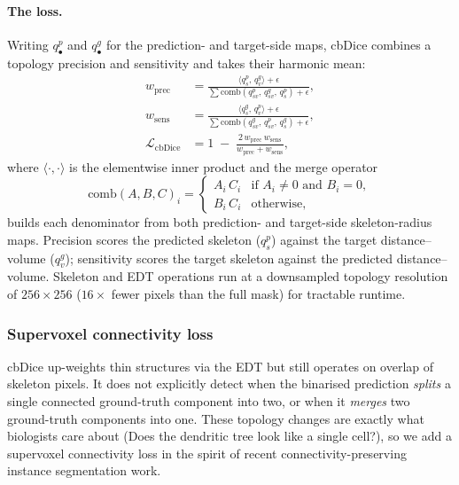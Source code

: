 \documentclass[11pt,a4paper]{article}
\begin{document}
\paragraph{The loss.} Writing $q^{p}_\bullet$ and $q^{g}_\bullet$ for the
prediction- and target-side maps, cbDice combines a topology precision
and sensitivity and takes their harmonic mean:
\begin{align}
    w_\text{prec} &= \frac{\langle q^{p}_s,\, q^{g}_v \rangle + \epsilon}
        {\sum \mathrm{comb}(q^{p}_{sv},\, q^{g}_{sv},\, q^{p}_s) + \epsilon}, \\
    w_\text{sens} &= \frac{\langle q^{g}_s,\, q^{p}_v \rangle + \epsilon}
        {\sum \mathrm{comb}(q^{g}_{sv},\, q^{p}_{sv},\, q^{g}_s) + \epsilon}, \\
    \mathcal{L}_\text{cbDice} &= 1 \;-\;
        \frac{2\, w_\text{prec}\, w_\text{sens}}{w_\text{prec} + w_\text{sens}},
\end{align}
where $\langle \cdot, \cdot \rangle$ is the elementwise inner product and
the merge operator
\begin{equation}
    \mathrm{comb}(A,B,C)_i =
    \begin{cases}
        A_i\,C_i & \text{if } A_i \neq 0 \text{ and } B_i = 0, \\
        B_i\,C_i & \text{otherwise},
    \end{cases}
\end{equation}
builds each denominator from both prediction- and target-side
skeleton-radius maps. Precision scores the predicted skeleton ($q^{p}_s$)
against the target distance--volume ($q^{g}_v$); sensitivity scores the
target skeleton against the predicted distance--volume. Skeleton and EDT
operations run at a downsampled topology resolution of $256 {\times} 256$
($16 \times$ fewer pixels than the full mask) for tractable runtime.

\subsubsection{Supervoxel connectivity loss}
\label{sec:supervoxel}

cbDice up-weights thin structures via the EDT but still operates on
overlap of skeleton pixels. It does not explicitly detect when the
binarised prediction \emph{splits} a single connected ground-truth
component into two, or when it \emph{merges} two ground-truth
components into one. These topology changes are exactly what
biologists care about (Does the dendritic tree look like a single
cell?), so we add a supervoxel
connectivity loss in the spirit of recent connectivity-preserving
instance segmentation work.
\end{document}
